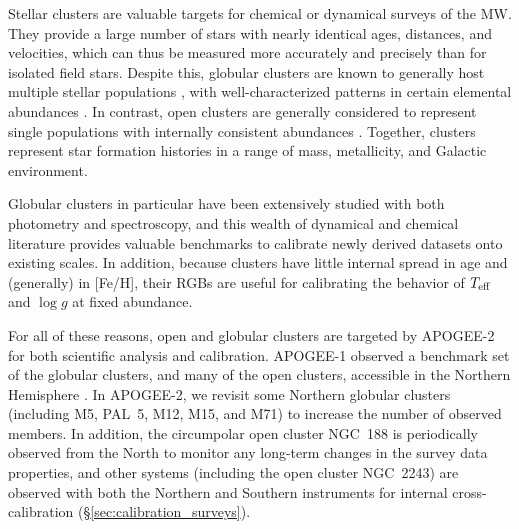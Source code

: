 \documentclass[12pt,twocolumn]{emulateapj}
\begin{document}
Stellar clusters are valuable targets for chemical or dynamical surveys of the MW.  They provide a large number of stars with nearly identical ages, distances, and velocities, which can thus be measured more accurately and precisely than for isolated field stars.  Despite this, globular clusters are known to generally host multiple stellar populations \citep[e.g.,][]{mp_milone}, with well-characterized patterns in certain elemental abundances \citep[see][for a review]{Gratton_2012_multipleGCpops}.  In contrast, open clusters are generally considered to represent single populations with internally consistent abundances \citep[e.g.,][but see also \citet{Liu_2016_inhomogeneityM67,Liu_2016_inhomogeneityHyades}]{oc_jobovy,Ness_2017_stellardoppelgangers}.  Together, clusters represent star formation histories in a range of mass, metallicity, and Galactic environment.

Globular clusters in particular have been extensively studied with both photometry and spectroscopy, and this wealth of dynamical and chemical literature provides valuable benchmarks to calibrate newly derived datasets onto existing scales.  In addition, because clusters have little internal spread in age and (generally) in [Fe/H], 
their RGBs are useful for calibrating the behavior of $T_{\rm eff}$ and $\log{g}$ at fixed abundance.

For all of these reasons, open and globular clusters are targeted by APOGEE-2 for both scientific analysis and calibration.  APOGEE-1 observed a benchmark set of the globular clusters, and many of the open clusters, accessible in the Northern Hemisphere \citep[see][for calibration details]{Meszaros_2013_aspcapcalib, Holtzman_2015_apogeedata}.  In APOGEE-2, we revisit some Northern globular clusters (including M5, PAL~5, M12, M15, and M71) to increase the number of observed members.  In addition, the circumpolar open cluster NGC~188 is periodically observed from the North to monitor any long-term changes in the survey data properties, and other systems (including the open cluster NGC~2243) are observed with both the Northern and Southern instruments for internal cross-calibration (\S\ref{sec:calibration_surveys}).  
\end{document}
